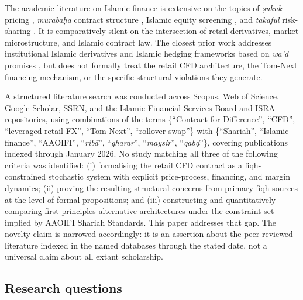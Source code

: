 \documentclass[preprint,12pt,authoryear]{elsarticle}
\theoremstyle{definition}
\begin{document}
The academic literature on Islamic finance is extensive on the topics
of \emph{\d{s}uk\={u}k} pricing \citep{Cakir2007,Jobst2007},
\emph{mur\={a}ba\d{h}a} contract structure \citep{Usmani2002}, Islamic
equity screening \citep{Derigs2008,Kunhibava2010}, and
\emph{tak\={a}ful} risk-sharing \citep{Iqbal2011}. It is comparatively
silent on the intersection of retail derivatives, market
microstructure, and Islamic contract law. The closest prior work
addresses institutional Islamic derivatives
\citep{DeLorenzo2007,Bacha1999} and Islamic hedging frameworks based on
\emph{wa'd} promises \citep{Bacha2013}, but does not formally treat the
retail CFD architecture, the Tom-Next financing mechanism, or the
specific structural violations they generate.

A structured literature search was conducted across Scopus, Web
of Science, Google Scholar, SSRN, and the Islamic Financial
Services Board and ISRA repositories, using combinations of the
terms \{``Contract for Difference'', ``CFD'', ``leveraged retail
FX'', ``Tom-Next'', ``rollover swap''\} with \{``Shariah'',
``Islamic finance'', ``AAOIFI'', ``\emph{ribā}'', ``\emph{gharar}'',
``\emph{maysir}'', ``\emph{qab\d{d}}''\}, covering publications
indexed through January 2026. No study matching all three of the
following criteria was identified: (i) formalising the retail
CFD contract as a fiqh-constrained stochastic system with explicit
price-process, financing, and margin dynamics; (ii) proving the
resulting structural concerns from primary fiqh sources at the
level of formal propositions; and (iii) constructing and
quantitatively comparing first-principles alternative
architectures under the constraint set implied by AAOIFI Shariah
Standards. This paper addresses that gap. The novelty claim is
narrowed accordingly: it is an assertion about the peer-reviewed
literature indexed in the named databases through the stated
date, not a universal claim about all extant scholarship.

\subsection{Research questions}
\label{sec:rqs}
\end{document}

